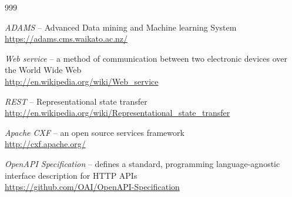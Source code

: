 
\begin{thebibliography}{999}

		\textit{ADAMS} -- Advanced Data mining and Machine learning System \\
		{\scriptsize \url{https://adams.cms.waikato.ac.nz/}{}}
		
		\textit{Web service} -- a method of communication between two electronic 
		devices over the World Wide Web \\
		{\scriptsize \url{http://en.wikipedia.org/wiki/Web_service}{}}
		
		\textit{REST} -- Representational state transfer \\
		{\scriptsize \url{http://en.wikipedia.org/wiki/Representational_state_transfer}{}}

		\textit{Apache CXF} -- an open source services framework \\
		{\scriptsize \url{http://cxf.apache.org/}{}}

		\textit{OpenAPI Specification} -- defines a standard, programming language-agnostic interface description for HTTP APIs \\
		{\scriptsize \url{https://github.com/OAI/OpenAPI-Specification}{}}

\end{thebibliography}
